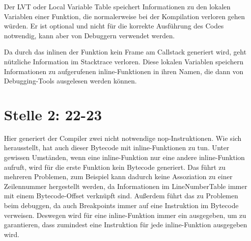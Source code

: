 Der LVT oder Local Variable Table speichert Informationen zu den lokalen Variablen einer Funktion, die normalerweise
bei der Kompilation verloren gehen würden.
Er ist optional und nicht für die korrekte Ausführung des Codes notwendig, kann aber von
Debuggern verwendet werden.\cite{jvmspecLVT}

Da durch das inlinen der Funktion kein Frame am Callstack generiert wird, geht nützliche Information im Stacktrace
verloren.
Diese lokalen Variablen speichern Informationen zu aufgerufenen inline-Funktionen in ihren Namen, die dann von
Debugging-Tools ausgelesen werden können.\cite{youTrackFakeVariables}

\section{Stelle 2: 22-23}

Hier generiert der Compiler zwei nicht notwendige nop-Instruktionen.
Wie sich herausstellt, hat auch dieser Bytecode mit inline-Funktionen zu tun.
Unter gewissen Umständen, \zB wenn eine inline-Funktion nur eine andere inline-Funktion aufruft,
wird für die erste Funktion kein Bytecode generiert.
Das führt zu mehreren Problemen, zum Beispiel kann dadurch keine Assoziation zu einer Zeilennummer hergestellt werden,
da Informationen im LineNumberTable immer mit einem Bytecode-Offset verknüpft sind.
Außerdem führt das zu Problemen beim debuggen, da auch Breakpoints immer auf eine Instruktion im Bytecode verweisen.
Deswegen wird für eine inline-Funktion immer ein  ausgegeben, um zu garantieren, dass
zumindest eine Instruktion für jede inline-Funktion ausgegeben wird.\cite{youTrackNops}

\renewcommand{\kapitelautor}{}
